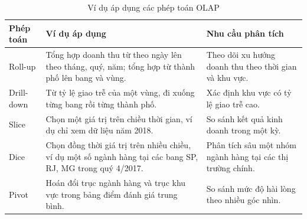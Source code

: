 \begin{table}[H]
\centering
\small{}
\caption{Ví dụ áp dụng các phép toán OLAP}
\label{tab:olap}
\begin{tabularx}{\linewidth}{|P{2.2cm}|>{\raggedright\arraybackslash}X|P{4.6cm}|}
\hline
\textbf{Phép toán} & \textbf{Ví dụ áp dụng} & \textbf{Nhu cầu phân tích}\\ \hline
Roll-up & Tổng hợp doanh thu từ theo ngày lên theo tháng, quý, năm; tổng hợp từ thành phố lên bang và vùng. & Theo dõi xu hướng doanh thu theo thời gian và khu vực.\\ \hline
Drill-down & Từ tỷ lệ giao trễ của một vùng, đi xuống từng bang rồi từng thành phố. & Xác định khu vực có tỷ lệ giao trễ cao.\\ \hline
Slice & Chọn một giá trị trên chiều thời gian, ví dụ chỉ xem dữ liệu năm 2018. & So sánh kết quả kinh doanh trong một kỳ.\\ \hline
Dice & Chọn đồng thời giá trị trên nhiều chiều, ví dụ một số ngành hàng tại các bang SP, RJ, MG trong quý 4/2017. & Phân tích sâu một nhóm ngành hàng tại các thị trường chính.\\ \hline
Pivot & Hoán đổi trục ngành hàng và trục khu vực trong bảng điểm đánh giá trung bình. & So sánh mức độ hài lòng theo nhiều góc nhìn.\\ \hline
\end{tabularx}
\end{table}
